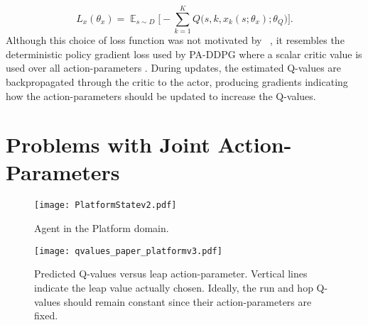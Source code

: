 \documentclass{article}
\newcommand{\Expec}{\displaystyle \mathbb{E}}
\def\PDQN*{P\nobreakdash-DQN}
\def\PADDPG*{PA\nobreakdash-DDPG}
\newcommand{\citet}[1]
{\citeauthor{#1}~\shortcite{#1}}
\newcommand{\citep}{\cite}
\begin{document}
\begin{equation}\label{eq:action_parameter_loss}
L_x(\theta_x) = \mathop{\Expec}_{s \sim D}\Bigg[ - \sum_{k=1}^K Q\big(s,k,x_k(s;\theta_x);\theta_Q\big) \Bigg].
\end{equation}
Although this choice of loss function was not motivated by \citet{xiong2018}, it resembles the deterministic policy gradient loss used by \PADDPG* where a scalar critic value is used over all action-parameters \citep{hausknecht2016}. During updates, the estimated Q-values are backpropagated through the critic to the actor, producing gradients indicating how the action-parameters should be updated to increase the Q-values.

\section{Problems with Joint Action-Parameters}
\begin{figure*}[ht!]
	\begin{subfigure}[t]{0.32\textwidth}
		\centering
		\texttt{[image: PlatformStatev2.pdf]}
\caption{Agent in the Platform domain.}
		\label{fig:platform_state}
	\end{subfigure}\hspace{0.1cm}
	\begin{subfigure}[t]{0.67\textwidth}
		\centering
\texttt{[image: qvalues\_paper\_platformv3.pdf]}
\caption{Predicted Q-values versus leap action-parameter. Vertical lines indicate the leap value actually chosen. Ideally, the run and hop Q-values should remain constant since their action-parameters are fixed.}
		\label{fig:platform_state_qvalues}
	\end{subfigure}
	\caption[Example of sensitivity to unrelated action-parameters affecting discrete action selection]{Example of dependence on unrelated action-parameters affecting discrete action selection on the Platform domain. Three parameterised actions are available: \emph{run}, \emph{hop}, and \emph{leap}. In a particular state (), the optimal action is to run forward to be able to traverse a gap, while choosing to leap would cause the agent to fall and die. The Q-value of the leap action should change with its action-parameter, but () shows that varying the leap action-parameter while the others are kept fixed changes the Q-values predicted by \PDQN* for \emph{all} actions. Near the start of training, this can alter the discrete policy such that a suboptimal action is chosen. After $80\,000$ episodes, \PDQN* correctly learns to choose the optimal action regardless of the unrelated leap action-parameter, although the other Q-values still vary.}
	\label{fig:example_sensitivity}
\end{figure*}
\end{document}
